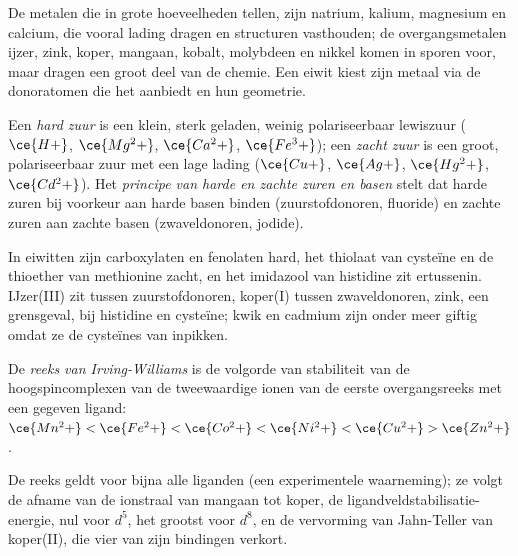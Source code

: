 De metalen die in grote hoeveelheden tellen, zijn natrium, kalium,
magnesium en calcium, die vooral lading dragen en structuren
vasthouden; de overgangsmetalen ijzer, zink, koper, mangaan, kobalt,
molybdeen en nikkel komen in sporen voor, maar dragen een groot deel van
de chemie. Een eiwit kiest zijn metaal via de donoratomen die het aanbiedt
en hun geometrie.

\begin{definition}\label{def:b3:bioinorganic:hsab}
Een \emph{hard zuur} is een klein, sterk geladen, weinig
polariseerbaar lewiszuur ($\ce{H+}$, $\ce{Mg^2+}$, $\ce{Ca^2+}$, $\ce{Fe^3+}$); een
\emph{zacht zuur} is een groot, polariseerbaar zuur met
een lage lading ($\ce{Cu+}$, $\ce{Ag+}$,
$\ce{Hg^2+}$, $\ce{Cd^2+}$). Het
\emph{principe van harde en zachte zuren en basen}
stelt dat harde zuren bij voorkeur aan harde basen binden
(zuurstofdonoren, fluoride) en zachte zuren aan zachte basen
(zwaveldonoren, jodide).
\end{definition}

In eiwitten zijn carboxylaten en fenolaten hard, het thiolaat van
cysteïne en de thioether van methionine zacht, en het imidazool van
histidine zit ertussenin. IJzer(III) zit tussen zuurstofdonoren,
koper(I) tussen zwaveldonoren, zink, een grensgeval, bij histidine en
cysteïne; kwik en cadmium zijn onder meer giftig omdat ze de cysteïnes
van  inpikken.

\begin{definition}\label{def:b3:bioinorganic:irving-williams}
De \emph{reeks van Irving-Williams} is de
volgorde van stabiliteit van de hoogspincomplexen van de tweewaardige
ionen van de eerste overgangsreeks met een gegeven ligand:
$\ce{Mn^2+} < \ce{Fe^2+} < \ce{Co^2+} < \ce{Ni^2+} < \ce{Cu^2+} > \ce{Zn^2+}$.
\end{definition}

\begin{proposition}\label{prop:b3:bioinorganic:irving-williams}
De reeks geldt voor bijna alle liganden (een experimentele waarneming);
ze volgt de afname van de ionstraal van mangaan tot koper, de
ligandveldstabilisatie-energie, nul voor $d^5$, het grootst voor $d^8$, en de vervorming van
Jahn-Teller van koper(II), die vier van zijn bindingen verkort.
\end{proposition}

